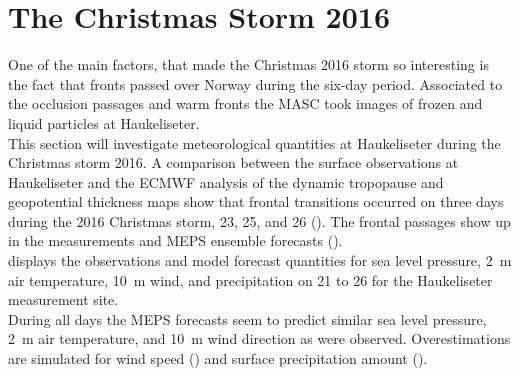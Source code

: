 \section{The Christmas Storm 2016}\label{sec:res:large_scale_sfc}
One of the main factors, that made the Christmas 2016 storm so interesting is the fact that fronts passed over Norway during the six-day period. Associated to the occlusion passages and warm fronts the MASC took images of frozen and liquid particles at Haukeliseter.
\\
This section will investigate meteorological quantities at Haukeliseter during the Christmas storm 2016. 
A comparison between the surface observations at Haukeliseter and the ECMWF analysis of the dynamic tropopause and geopotential thickness maps show that frontal transitions occurred on three days during the 2016 Christmas storm, \num{23}, \num{25}, and \SI{26}{\dec} (). The frontal passages show up in the measurements and MEPS ensemble forecasts ().
\\
 displays the observations and model forecast quantities for sea level pressure, \SI{2}{\metre} air temperature, \SI{10}{\metre} wind, and precipitation on \num{21} to \SI{26}{\dec} for the Haukeliseter measurement site. 
\\
During all days the MEPS forecasts seem to predict similar sea level pressure, \SI{2}{\metre} air temperature, and \SI{10}{\metre} wind direction as were observed. Overestimations are simulated for wind speed () and surface precipitation amount ().
